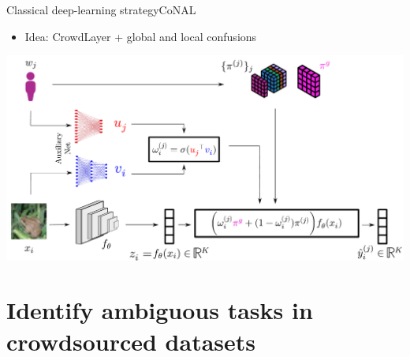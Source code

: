 \begin{frame}{Classical deep-learning strategy}{CoNAL}
    \begin{itemize}
        \item Idea: CrowdLayer + global and local confusions
    \end{itemize}
    \begin{center}
        \includegraphics[width=\textwidth]{./images/conal_scheme.pdf}
    \end{center}

\end{frame}

\section{Identify ambiguous tasks in crowdsourced datasets}

